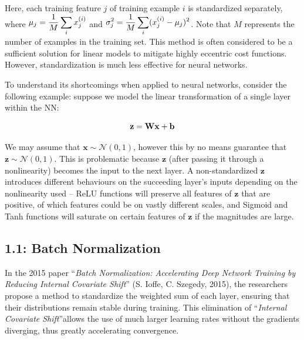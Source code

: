 \documentclass{article}
\begin{document}
\begin{multicols}{2}
Here, each training feature $j$ of training example $i$ is standardized separately, 
where $\begin{aligned}
    \mu_j = {1\over M}\sum_i x^{(i)}_j
\end{aligned}$ and $\begin{aligned}
    \sigma^2_j = {1\over M}\sum_i (x^{(i)}_j - \mu_j)^2
\end{aligned}$. Note that $M$ represents the number of examples in the 
training set. This method is often considered to be a sufficient solution 
for linear models to mitigate highly eccentric cost functions. However, 
standardization is much less effective for neural networks.

To understand its shortcomings when applied to neural networks, consider
the following example: suppose we model the linear transformation 
of a single layer within the NN:

\begin{equation}
    \textbf{z} = \textbf{Wx} + \textbf{b} \notag
\end{equation}

We may assume that $\textbf{x} \sim \mathcal{N}(0, 1)$, however this by no means
guarantee that $\textbf{z} \sim \mathcal{N}(0, 1)$. This is problematic because 
$\textbf{z}$ (after passing it through a nonlinearity) becomes the input to
the next layer. A non-standardized $\textbf{z}$ introduces different
behaviours on the succeeding layer's inputs depending on the nonlinearity 
used -- ReLU functions will preserve all features of $\textbf{z}$ that are positive,
of which features could be on vastly different scales,
and Sigmoid and Tanh functions will saturate on certain features of $\textbf{z}$
if the magnitudes are large.










\subsection*{1.1: Batch Normalization}
In the 2015 paper ``\textit{Batch Normalization: Accelerating Deep Network Training 
by Reducing Internal Covariate Shift}'' (S. Ioffe, C. Szegedy, 2015), the researchers
propose a method to standardize the weighted sum of each layer, ensuring that their
distributions remain stable during training. This elimination of ``\textit{Internal Covariate Shift}''allows the use of much larger learning
rates without the gradients diverging, thus greatly accelerating convergence.


\end{multicols}
\end{document}
